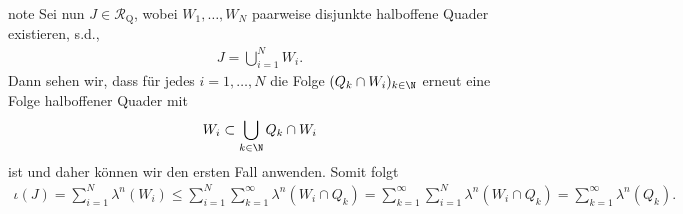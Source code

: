 \documentclass[letterpaper,10pt,english]{jupyterBook}
\begin{document}
\begin{sphinxadmonition}{note}
\sphinxAtStartPar
Sei nun \(J\in\mathcal{R}_{\text{Q}}\), wobei \(W_1,\ldots,W_N\) paarweise disjunkte halboffene Quader existieren, s.d.,
\begin{equation*}
\begin{split}J = \bigcup_{i=1}^N W_i.\end{split}
\end{equation*}
\sphinxAtStartPar
Dann sehen wir, dass für jedes \(i=1,\ldots,N\) die Folge \((Q_k\cap W_i)_{k\in\N}\) erneut eine Folge halboffener Quader mit
\begin{equation*}
\begin{split}W_i \subset \bigcup_{k\in\N} Q_k\cap W_i\end{split}
\end{equation*}
\sphinxAtStartPar
ist und daher können wir den ersten Fall anwenden. Somit folgt
\begin{equation*}
\begin{split}\iota(J) = \sum_{i=1}^N \lambda^n(W_i) \leq \sum_{i=1}^N \sum_{k=1}^\infty \lambda^n(W_i\cap Q_k) = 
\sum_{k=1}^\infty\sum_{i=1}^N \lambda^n(W_i\cap Q_k) = \sum_{k=1}^\infty \lambda^n(Q_k).\end{split}
\end{equation*}\end{sphinxadmonition}
\end{document}
